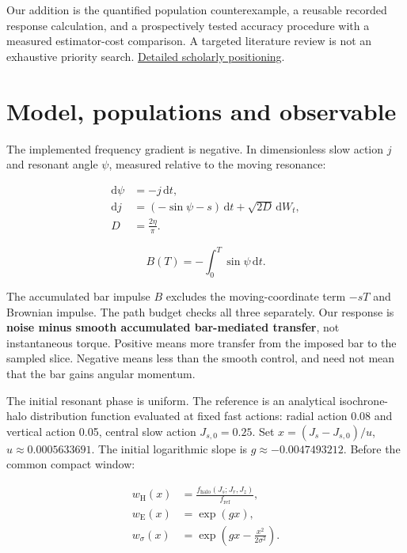 \documentclass[fleqn,usenatbib]{mnras}
\begin{document}
Our addition is the quantified population counterexample, a reusable recorded response calculation, and a prospectively tested accuracy procedure with a measured estimator-cost comparison. A targeted literature review is not an exhaustive priority search. \href{https://djova.ca/galaxy-bar/diagnostics/population-accuracy/SOURCES.md}{Detailed scholarly positioning}.

\section{Model, populations and observable}\label{model}

The implemented frequency gradient is negative. In dimensionless slow action \(j\) and resonant angle \(\psi\), measured relative to the moving resonance:

\begin{equation}\label{EQ-DYN-01}
\begin{aligned}
\mathrm d\psi &= -j\,\mathrm dt,\\
\mathrm dj &= (-\sin\psi-s)\,\mathrm dt + \sqrt{2D}\,\mathrm dW_t,\\
D &= \frac{2\eta}{\pi}.
\end{aligned}
\end{equation}

\begin{equation}\label{EQ-OBS-01}
B(T)=-\int_0^T\sin\psi\,\mathrm dt.
\end{equation}

The accumulated bar impulse \(B\) excludes the moving-coordinate term \(-sT\) and Brownian impulse. The path budget checks all three separately. Our response is \textbf{noise minus smooth accumulated bar-mediated transfer}, not instantaneous torque. Positive means more transfer from the imposed bar to the sampled slice. Negative means less than the smooth control, and need not mean that the bar gains angular momentum.

The initial resonant phase is uniform. The reference is an analytical isochrone-halo distribution function evaluated at fixed fast actions: radial action 0.08 and vertical action 0.05, central slow action \(J_{s,0}=0.25\). Set \(x=(J_s-J_{s,0})/u\), \(u\approx0.0005633691\). The initial logarithmic slope is \(g\approx-0.0047493212\). Before the common compact window:

\begin{equation}\label{EQ-POP-01}
\begin{aligned}
w_{\mathrm H}(x)&=\frac{f_{\mathrm{halo}}(J_s;J_r,J_z)}{f_{\mathrm{ref}}},\\
w_{\mathrm E}(x)&=\exp(gx),\\
w_{\sigma}(x)&=\exp\!\left(gx-\frac{x^2}{2\sigma^2}\right).
\end{aligned}
\end{equation}
\end{document}

